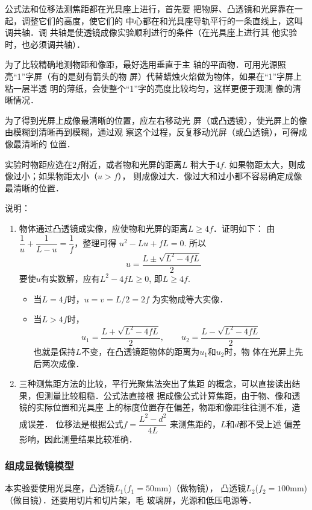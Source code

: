 公式法和位移法测焦距都在光具座上进行，首先要
把物屏、凸透镜和光屏靠在一起，调整它们的高度，使它们的
中心都在和光具座导轨平行的一条直线上，这叫调共轴．调
共轴是使透镜成像实验顺利进行的条件（在光具座上进行其
他实验时，也必须调共轴）．

为了比较精确地测物距和像距，最好选用垂直于主
轴的平面物．可用光源照亮“1”字屏（有的是刻有箭头的物
屏）代替蜡烛火焰做为物体，如果在“1”字屏上粘一层半透
明的薄纸，会使整个“1”字的亮度比较均匀，这样更便于观测
像的清晰情况．

为了得到光屏上成像最清晰的位置，应左右移动光
屏（或凸透镜），使光屏上的像由模糊到清晰再到模糊，通过观
察这个过程，反复移动光屏（或凸透镜），可得成像最清晰的
位置．

实验时物距应选在$2f$附近，或者物和光屏的距离$L$
稍大于$4f$. 如果物距太大，则成像过小；如果物距太小（$u>f$），
则成像过大．像过大和过小都不容易确定成像最清晰的位置．

说明：
\begin{enumerate}
    \item 物体通过凸透镜成实像，应使物和光屏的距离$L\ge 4f$．证明如下：
    由$\dfrac{1}{u}+\dfrac{1}{L-u}=\dfrac{1}{f}$，整理可得
    $u^2-Lu+fL=0$.
所以
\[u=\frac{L\pm\sqrt{L^2-4fL}}{2}\]    
要使$u$有实数解，应有$L^2-4fL\ge 0$, 即$L\ge 4f$.
\begin{itemize}
    \item 当$L=4f$时，$u=v=L/2=2f$
    为实物成等大实像．
    \item 当$L>4f$时，
    \[u_1=\frac{L+\sqrt{L^2-4fL}}{2},\qquad u_2=\frac{L-\sqrt{L^2-4fL}}{2}\]
    也就是保持$L$不变，在凸透镜距物体的距离为$u_1$和$u_2$时，物
    体在光屏上先后两次成像．
\end{itemize}

\item 三种测焦距方法的比较，平行光聚焦法突出了焦距
的概念，可以直接读出结果，但测量比较粗糙．公式法直接根
据成像公式计算焦距，由于物、像和透镜的实际位置和光具座
上的标度位置存在偏差，物距和像距往往测不准，造成误差．
位移法是根据公式$f=\dfrac{L^2-d^2}{4L}$
来测焦距的，$L$和$d$都不受上述
偏差影响，因此测量结果比较准确．
\end{enumerate}

\subsubsection{组成显微镜模型}
本实验要使用光具座，凸透镜$L_1$($f_1=50$mm)（做物镜），
凸透镜$L_2$($f_2=100$mm)（做目镜）．还要用切片和切片架，毛
玻璃屏，光源和低压电源等．

